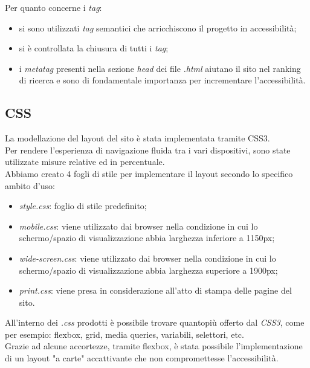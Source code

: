 \documentclass[]{article}
\begin{document}
Per quanto concerne i \textit{tag}:
\begin{itemize}
	\item si sono utilizzati \textit{tag} semantici che arricchiscono il progetto in accessibilità;
	\item si è controllata la chiusura di tutti i \textit{tag};
	\item i \textit{metatag} presenti nella sezione \textit{head} dei file \textit{.html} aiutano il sito nel ranking di ricerca e sono di fondamentale importanza per incrementare l'accessibilità.
\end{itemize}

\subsection{CSS}
La modellazione del layout del sito è stata implementata tramite CSS3.\\
Per rendere l'esperienza di navigazione fluida tra i vari dispositivi, sono state utilizzate misure relative ed in percentuale.\\
Abbiamo creato 4 fogli di stile per implementare il layout secondo lo specifico ambito d'uso:
\begin{itemize}
	\item \textit{style.css}: foglio di stile predefinito;
	\item \textit{mobile.css}: viene utilizzato dai browser nella condizione in cui lo schermo/spazio di visualizzazione abbia larghezza inferiore a 1150px;
	\item \textit{wide-screen.css}: viene utilizzato dai browser nella condizione in cui lo schermo/spazio di visualizzazione abbia larghezza superiore a 1900px;
	\item \textit{print.css}: viene presa in considerazione all'atto di stampa delle pagine del sito.
\end{itemize}
All'interno dei \textit{.css} prodotti è possibile trovare quantopiù offerto dal \textit{CSS3}, come per esempio: flexbox, grid, media queries, variabili, selettori, etc.\\
Grazie ad alcune accortezze, tramite flexbox, è stata possibile l'implementazione di un layout  "a carte" accattivante che non compromettesse l'accessibilità.
\end{document}
